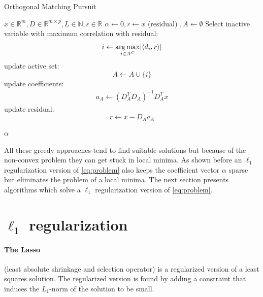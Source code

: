 \begin{algorithm}
\caption{Orthogonal Matching Pursuit}
\label{alg:omp}
\begin{algorithmic}[1]
\REQUIRE $x \in \mathbb{R}^m, D \in \mathbb{R}^{m\times p}, L \in \mathbb{N}, \epsilon \in \mathbb{R}$
\STATE $\alpha \gets 0, r \gets x $ (residual) $, A \gets \emptyset$
\STATE Select inactive variable with maximum correlation with residual: 
\begin{equation*}
i \gets \operatorname*{arg\,max}_{i \in A^C} \lvert \left<d_i,r\right> \rvert
\end{equation*}
\STATE update active set:
\begin{equation*}
 A \gets A \cup \{i\} 
\end{equation*}
\STATE update coefficients: 
\begin{align}
a_A \gets \left( D_A^T D_A \right)^{-1} D_A^T x  \label{eq:omp_update}
\end{align}
\STATE update residual:
\begin{equation*}
 r \gets x-D_Aa_A
\end{equation*}
 

\ENDFOR
\RETURN $\alpha$
\end{algorithmic}
\end{algorithm}


All these greedy approaches tend to find suitable solutions but because of the
non-convex problem they can get stuck in local minima. As shown before an
$\ell_1$ regularization version of \ref{eq:problem} also keeps the coefficient
vector $\alpha$ sparse but eliminates the problem of a local minima. The next
section presents algorithms which solve  a $\ell_1$ regularization version of
\ref{eq:problem}.



\section {$\ell_1$ regularization}



\paragraph{The Lasso} (least absolute shrinkage and selection operator) is a
regularized version of a least squares solution. The regularized version is
found by adding a constraint that induces the $L_1$-norm of the solution to be
small.\cite{Tibshirani1996}

